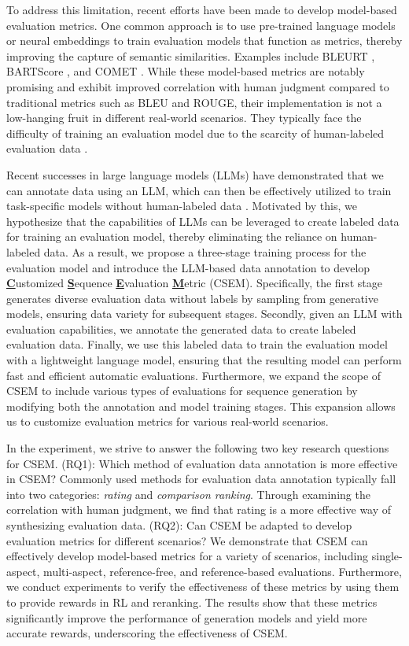 \documentclass[lettersize,journal]{IEEEtran}
\begin{document}
To address this limitation, recent efforts have been made to develop model-based evaluation metrics. One common approach is to use pre-trained language models or neural embeddings to train evaluation models that function as metrics, thereby improving the capture of semantic similarities. Examples include BLEURT \cite{sellam2020bleurt}, BARTScore \cite{yuan2021bartscore}, and COMET \cite{rei2022comet}. While these model-based metrics are notably promising and exhibit improved correlation with human judgment compared to traditional metrics such as BLEU and ROUGE, their implementation is not a low-hanging fruit in different real-world scenarios. They typically face the difficulty of training an evaluation model due to the scarcity of human-labeled evaluation data \cite{rei2022comet}. 

Recent successes in large language models (LLMs) have demonstrated that we can annotate data using an LLM, which can then be effectively utilized to train task-specific models without human-labeled data \cite{wang2022self,nijkamp2022codegen,xiao2025foundationslargelanguagemodels}. Motivated by this, we hypothesize that the capabilities of LLMs can be leveraged to create labeled data for training an evaluation model, thereby eliminating the reliance on human-labeled data. As a result, we propose a three-stage training process for the evaluation model and introduce the LLM-based data annotation to develop \textbf{\underline{C}}ustomized \textbf{\underline{S}}equence \textbf{\underline{E}}valuation \textbf{\underline{M}}etric (CSEM). Specifically, the first stage generates diverse evaluation data without labels by sampling from generative models, ensuring data variety for subsequent stages. Secondly, given an LLM with evaluation capabilities, we annotate the generated data to create labeled evaluation data. Finally, we use this labeled data to train the evaluation model with a lightweight language model, ensuring that the resulting model can perform fast and efficient automatic evaluations. Furthermore, we expand the scope of CSEM to include various types of evaluations for sequence generation by modifying both the annotation and model training stages. This expansion allows us to customize evaluation metrics for various real-world scenarios.

In the experiment, we strive to answer the following two key research questions for CSEM. (RQ1): Which method of evaluation data annotation is more effective in CSEM? Commonly used methods for evaluation data annotation typically fall into two categories: \textit{rating} and \textit{comparison ranking}. Through examining the correlation with human judgment, we find that rating is a more effective way of synthesizing evaluation data. (RQ2): Can CSEM be adapted to develop evaluation metrics for different scenarios? We demonstrate that CSEM can effectively develop model-based metrics for a variety of scenarios, including single-aspect, multi-aspect, reference-free, and reference-based evaluations. Furthermore, we conduct experiments to verify the effectiveness of these metrics by using them to provide rewards in RL and reranking. The results show that these metrics significantly improve the performance of generation models and yield more accurate rewards, underscoring the effectiveness of CSEM.
\end{document}
